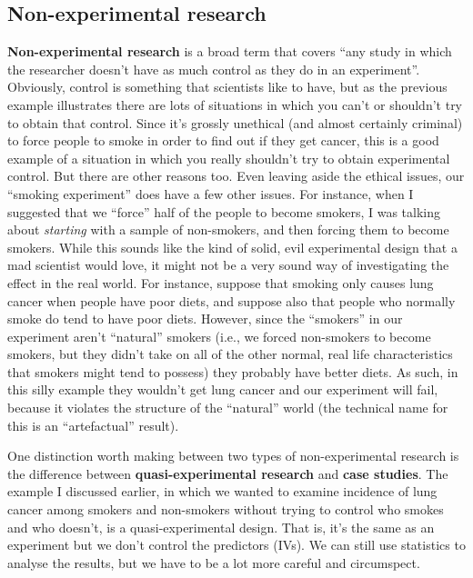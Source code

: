 \documentclass[
]{book}
\begin{document}
\hypertarget{non-experimental-research}{%
\subsection{Non-experimental research}\label{non-experimental-research}}

\textbf{Non-experimental research} is a broad term that covers ``any study in which the researcher doesn't have as much control as they do in an experiment''. Obviously, control is something that scientists like to have, but as the previous example illustrates there are lots of situations in which you can't or shouldn't try to obtain that control. Since it's grossly unethical (and almost certainly criminal) to force people to smoke in order to find out if they get cancer, this is a good example of a situation in which you really shouldn't try to obtain experimental control. But there are other reasons too. Even leaving aside the ethical issues, our ``smoking experiment'' does have a few other issues. For instance, when I suggested that we ``force'' half of the people to become smokers, I was talking about \emph{starting} with a sample of non-smokers, and then forcing them to become smokers. While this sounds like the kind of solid, evil experimental design that a mad scientist would love, it might not be a very sound way of investigating the effect in the real world. For instance, suppose that smoking only causes lung cancer when people have poor diets, and suppose also that people who normally smoke do tend to have poor diets. However, since the ``smokers'' in our experiment aren't ``natural'' smokers (i.e., we forced non-smokers to become smokers, but they didn't take on all of the other normal, real life characteristics that smokers might tend to possess) they probably have better diets. As such, in this silly example they wouldn't get lung cancer and our experiment will fail, because it violates the structure of the ``natural'' world (the technical name for this is an ``artefactual'' result).

One distinction worth making between two types of non-experimental research is the difference between \textbf{quasi-experimental research} and \textbf{case studies}. The example I discussed earlier, in which we wanted to examine incidence of lung cancer among smokers and non-smokers without trying to control who smokes and who doesn't, is a quasi-experimental design. That is, it's the same as an experiment but we don't control the predictors (IVs). We can still use statistics to analyse the results, but we have to be a lot more careful and circumspect.
\end{document}

